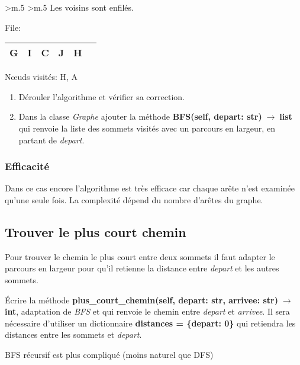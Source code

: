 \documentclass[a4paper,11pt]{article}
\begin{document}
\begin{Form}
\begin{tabular}{>{\centering\arraybackslash}m{} >{\centering\arraybackslash}m{}}
Les voisins sont enfilés.

File: \begin{tabular}{|c|c|c|c|c|c|}
\hline 
G & I & C & J & H &\\ 
\hline 
\end{tabular} 

Nœuds visités: H, A
\end{tabular} 
\begin{activite}
\begin{enumerate}
\item Dérouler l'algorithme  et vérifier sa correction.
\item Dans la classe \emph{Graphe} ajouter la méthode \textbf{BFS(self, depart: str)$\;\rightarrow\;$list} qui renvoie la liste des sommets visités avec un parcours en largeur, en partant de \emph{depart}.
\end{enumerate}
\end{activite}
\subsubsection{Efficacité}
Dans ce cas encore l'algorithme est très efficace car chaque arête n'est examinée qu'une seule fois. La complexité dépend du nombre d'arêtes du graphe.
\subsection{Trouver le plus court chemin}
Pour trouver le chemin le plus court entre deux sommets il faut adapter le parcours en largeur pour qu'il retienne la distance entre \emph{depart} et les autres sommets.
\begin{activite}
Écrire la méthode \textbf{plus\_court\_chemin(self, depart: str, arrivee: str)$\;\rightarrow\;$int}, adaptation de \emph{BFS} et qui renvoie le chemin entre \emph{depart} et \emph{arrivee}. Il sera nécessaire d'utiliser un dictionnaire \textbf{distances = \{depart: 0\}} qui retiendra les distances entre les sommets et \emph{depart}.
\end{activite}
\begin{commentprof}
BFS récursif est plus compliqué (moins naturel que DFS)
\end{commentprof}

\end{Form}
\end{document}
